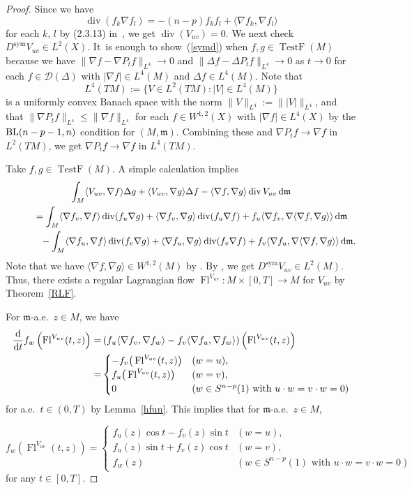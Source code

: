 \documentclass[10pt,a4paper]{amsart}
\numberwithin{equation}{section}
\theoremstyle{definition}
\newcommand{\TestF}{\operatorname{TestF}}
\newcommand{\sym}{\operatorname{sym}}
\newcommand{\Fl}{\operatorname{Fl}}
\newcommand{\mf}{\mathfrak{m}}
\newcommand{\Div}{\operatorname{div}}
\newcommand{\BL}{{\rm BL}}
\newcommand{\D}{\mathcal{D}}
\begin{document}
\begin{proof}
Since we have
\[
\Div(f_k\nabla f_l)=-(n-p)f_k f_l+\langle\nabla f_k,\nabla f_l\rangle
\]
for each $k$, $l$ by (2.3.13) in~\cite{Gig}, we get $\Div(V_{u v})=0$.
We next check $D^{\sym} V_{u v}\in L^2(X)$.
It~is enough to show~(\ref{symd}) when $f,g\in\TestF(M)$ because
we have $\|\nabla f -\nabla P_t f\|_{L^4}\to 0$ and $\|\Delta f-\Delta P_t f\|_{L^4}\to 0$ as $t\to 0$ for each $f\in \D(\Delta)$ with $|\nabla f|\in L^4(M)$ and $\Delta f\in L^4(M)$.
Note that
\[
L^4(T M):=\{V\in L^2(T M) \colon |V|\in L^4(M)\}
\]
is a uniformly convex Banach space with the norm $\|V\|_{L^4}:=\||V|\|_{L^4}$, and that $\|\nabla P_t f\|_{L^4}\leq \|\nabla f\|_{L^4}$ for each $f\in W^{1,2}(X)$ with $|\nabla f|\in L^4(X)$ by the $\BL(n-p-1,n)$ condition for $(M,\mf)$.
Combining these and $\nabla P_t f\to \nabla f$ in $L^2(T M)$, we get $\nabla P_t f\to \nabla f$ in $L^4(T M)$.

Take $f,g\in\TestF(M)$.
A simple calculation implies
\begin{gather*}
\int_M \langle V_{u v},\nabla f\rangle \Delta g+ \langle V_{u v},\nabla g\rangle\Delta f -\langle\nabla f,\nabla g\rangle\Div V_{u v}\,{\rm d}\mf
\\ \qquad
{}=\int_M \langle\nabla f_v,\nabla f\rangle \Div(f_u\nabla g)+ \langle \nabla f_v,\nabla g\rangle \Div(f_u\nabla f) +f_u\langle \nabla f_v,\nabla\langle\nabla f,\nabla g\rangle\rangle\, {\rm d}\mf
\\ \phantom{ qquad = }
-\int_M \langle\nabla f_u,\nabla f\rangle \Div(f_v\nabla g)+ \langle \nabla f_u,\nabla g\rangle \Div(f_v\nabla f) +f_v\langle \nabla f_u,\nabla\langle\nabla f,\nabla g\rangle\rangle\, {\rm d}\mf.
\end{gather*}
Note that we have $\langle\nabla f,\nabla g\rangle\in W^{1,2}(M)$ by \cite[Proposition~3.1.3]{Gig}.
By \cite[Definition~3.3.1 and~Theorem~3.3.8]{Gig}, we get $D^{\sym} V_{u v}\in L^2(M)$.
Thus, there exists a regular Lagrangian flow $\Fl^{V_{u v}} \colon M\times [0,T]\to M$ for $V_{ u v}$ by Theorem~\ref{RLF}.

For $\mf$-a.e.\ $z\in M$, we have
\begin{align*}
\frac{\rm d}{{\rm d} t}f_w \left(\Fl^{V_{u v}}(t,z)\right)
=&\left(f_u \langle \nabla f_v,\nabla f_w\rangle-f_v\langle\nabla f_u,\nabla f_w\rangle\right) \left(\Fl^{V_{u v}}(t,z)\right)\\
=&
\begin{cases}
-f_v \big(\Fl^{V_{u v}}(t,z)\big)& (w=u),
\\
f_u \big(\Fl^{V_{u v}}(t,z)\big)& (w=v),
\\
0&  (w\in S^{n-p}(1)\text{ with }u\cdot w=v\cdot w=0)
\end{cases}
\end{align*}
for a.e.\ $t\in(0,T)$ by Lemma~\ref{hfun}.
This implies that for $\mf$-a.e.\ $z\in M$,
{\samepage\[
f_w\left(\Fl^{V_{u v}}(t,z)\right)=
\begin{cases}
f_u(z) \cos t- f_v(z)\sin t & (w=u),
\\
f_u(z) \sin t+ f_v(z)\cos t& (w=v),
\\
f_w(z)& (w\in S^{n-p}(1)\text{ with }u\cdot w=v\cdot w=0)
\end{cases}
\]
for any $t\in [0,T]$.

}
\end{proof}
\end{document}
